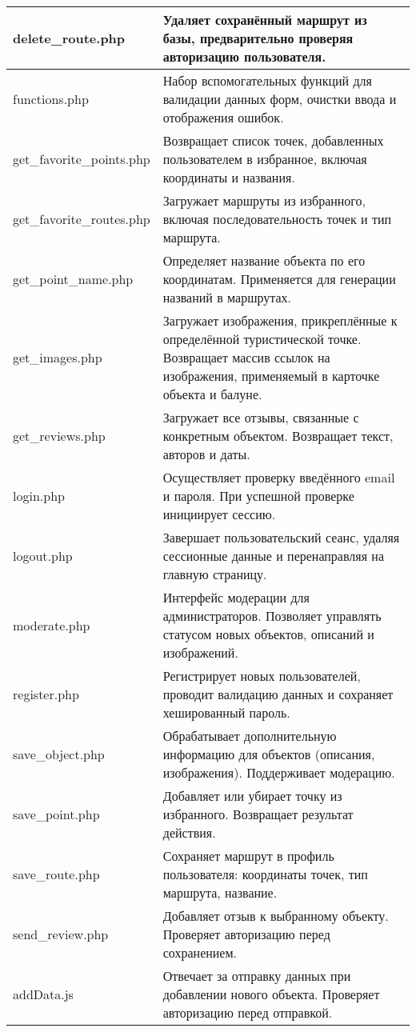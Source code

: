 \begin{xltabular}{\textwidth}{|l|X|}
\hline delete\_route.php & Удаляет сохранённый маршрут из базы, предварительно проверяя авторизацию пользователя.\\
\hline functions.php & Набор вспомогательных функций для валидации данных форм, очистки ввода и отображения ошибок.\\
\hline get\_favorite\_points.php & Возвращает список точек, добавленных пользователем в избранное, включая координаты и названия.\\
\hline get\_favorite\_routes.php & Загружает маршруты из избранного, включая последовательность точек и тип маршрута.\\
\hline get\_point\_name.php & Определяет название объекта по его координатам. Применяется для генерации названий в маршрутах.\\
\hline get\_images.php & Загружает изображения, прикреплённые к определённой туристической точке. Возвращает массив ссылок на изображения, применяемый в карточке объекта и балуне.\\
\hline get\_reviews.php & Загружает все отзывы, связанные с конкретным объектом. Возвращает текст, авторов и даты.\\
\hline login.php & Осуществляет проверку введённого email и пароля. При успешной проверке инициирует сессию.\\
\hline logout.php & Завершает пользовательский сеанс, удаляя сессионные данные и перенаправляя на главную страницу.\\
\hline moderate.php & Интерфейс модерации для администраторов. Позволяет управлять статусом новых объектов, описаний и изображений.\\
\hline register.php & Регистрирует новых пользователей, проводит валидацию данных и сохраняет хешированный пароль.\\
\hline save\_object.php & Обрабатывает дополнительную информацию для объектов (описания, изображения). Поддерживает модерацию.\\
\hline save\_point.php & Добавляет или убирает точку из избранного. Возвращает результат действия.\\
\hline save\_route.php & Сохраняет маршрут в профиль пользователя: координаты точек, тип маршрута, название.\\
\hline send\_review.php & Добавляет отзыв к выбранному объекту. Проверяет авторизацию перед сохранением.\\
\hline addData.js & Отвечает за отправку данных при добавлении нового объекта. Проверяет авторизацию перед отправкой.\\

\end{xltabular}
